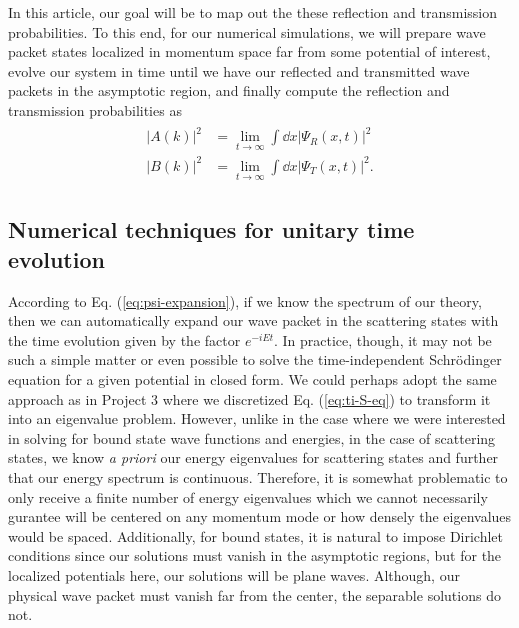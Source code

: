 In this article, our goal will be to map out the these reflection and transmission probabilities.
To this end, for our numerical simulations, we will prepare wave packet states localized in momentum space far from some potential of interest, evolve our system in time until we have our reflected and transmitted wave packets in the asymptotic region, and finally compute the reflection and transmission probabilities as
\begin{align}
\begin{aligned} 
    |A(k)|^2 &= \lim_{t \rightarrow \infty} \int \dd{x} |\Psi_{R}(x,t)|^2 \\
    |B(k)|^2 &= \lim_{t \rightarrow \infty} \int \dd{x} |\Psi_{T}(x,t)|^2
.\end{aligned}
\end{align}


\subsection{Numerical techniques for unitary time evolution}
\label{ssec:numerical-techniques-for-unitary-time-evolution}

According to Eq. (\ref{eq:psi-expansion}), if we know the spectrum of our theory, then we can automatically expand our wave packet in the scattering states with the time evolution given by the factor $e^{-i E t}$.
In practice, though, it may not be such a simple matter or even possible to solve the time-independent Schr\"{o}dinger equation for a given potential in closed form.
We could perhaps adopt the same approach as in Project 3 where we discretized Eq. (\ref{eq:ti-S-eq}) to transform it into an eigenvalue problem.
However, unlike in the case where we were interested in solving for bound state wave functions and energies, in the case of scattering states, we know \textit{a priori} our energy eigenvalues for scattering states and further that our energy spectrum is continuous.
Therefore, it is somewhat problematic to only receive a finite number of energy eigenvalues which we cannot necessarily gurantee will be centered on any momentum mode or how densely the eigenvalues would be spaced.
Additionally, for bound states, it is natural to impose Dirichlet conditions since our solutions must vanish in the asymptotic regions, but for the localized potentials here, our solutions will be plane waves.
Although, our physical wave packet must vanish far from the center, the separable solutions do not.

